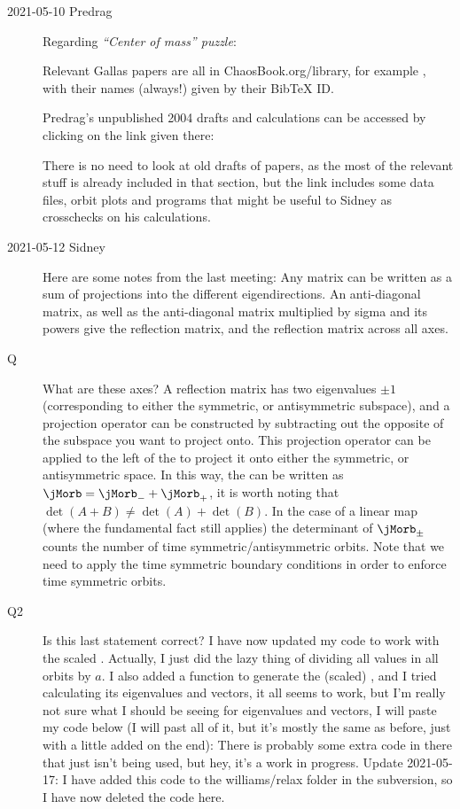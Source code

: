 \begin{description}
\item[2021-05-10 Predrag]
Regarding  {\em ``Center of mass'' puzzle}:

Relevant Gallas papers are all in ChaosBook.org/library, for example
, with their names (always!) given by their BibTeX ID.

Predrag's unpublished 2004 drafts and calculations can be accessed by
clicking on the link given there:


There is no need to  look at old drafts of papers, as the most of the
relevant stuff is already included in that section, but the link
includes some data files, orbit plots and programs that might be useful
to Sidney as crosschecks on his calculations.

\item[2021-05-12 Sidney]
Here are some notes from the last meeting: Any matrix can be written as a sum of projections into the different eigendirections. An anti-diagonal matrix, as well as the anti-diagonal matrix multiplied by sigma and its powers give the reflection matrix, and the reflection matrix across all axes.
\item[Q] What are these axes?
A reflection matrix has two eigenvalues $\pm 1$ (corresponding to either
the symmetric, or antisymmetric subspace), and a projection operator can
be constructed by subtracting out the opposite of the subspace you want
to project onto. This projection operator can be applied to the left of
the {\jacobianOrb} to project it onto either the symmetric, or
antisymmetric space. In this way, the {\jacobianOrb} can be written as
$\jMorb=\jMorb_-+\jMorb_+$, it is worth noting that
$\det(A+B)\neq \det(A)+\det(B)$. In the case of a linear map (where the
fundamental fact still applies) the determinant of $\jMorb_{\pm}$
counts the number of time symmetric/antisymmetric orbits. Note that we
need to apply the time symmetric boundary conditions in order to enforce
time symmetric orbits.
\item[Q2] Is this last statement correct?
I have now updated my code to work with the scaled {\HenonMap}. Actually, I just did the lazy thing of dividing all values in all orbits by $a$. I also added a function to generate the (scaled) {\jacobianOrb}, and I tried calculating its eigenvalues and vectors, it all seems to work, but I'm really not sure what I should be seeing for eigenvalues and vectors, I will paste my code below (I will past all of it, but it's mostly the same as before, just with a little added on the end):
There is probably some extra code in there that just isn't being used, but hey, it's a work in progress.
Update 2021-05-17: I have added this code to the williams/relax folder in the subversion, so I have now deleted the code here.


\end{description}
